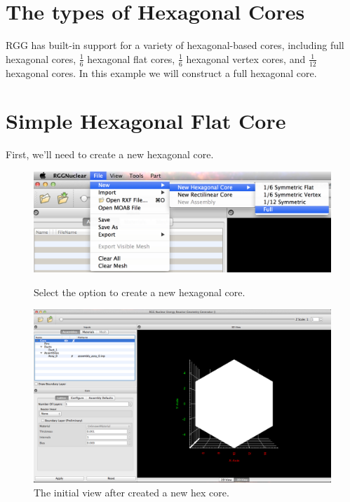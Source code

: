\section{The types of Hexagonal Cores}

RGG has built-in support for a variety of hexagonal-based cores, including full hexagonal cores, $\frac{1}{6}$ hexagonal flat cores, $\frac{1}{6}$ hexagonal vertex cores, and $\frac{1}{12}$ hexagonal cores.  In this example we will construct a full hexagonal core.

\section{Simple Hexagonal Flat Core}

First, we'll need to create a new hexagonal core.

\begin{figure}[h]
\centering
\begin{minipage}{.45\textwidth}
  \centering
	\includegraphics[width=0.9\linewidth]{Images/hex-new.png}
	\caption{Select the option to create a new hexagonal core.}
	\label{fig:Hex1}
\end{minipage}%
\hspace{0.5cm}
\begin{minipage}{.45\textwidth}
  \centering
	\includegraphics[width=0.9\linewidth]{Images/hex-new-init.png}
	\caption{The initial view after created a new hex core.}
	\label{fig:Hex2}
\end{minipage}
\end{figure}


